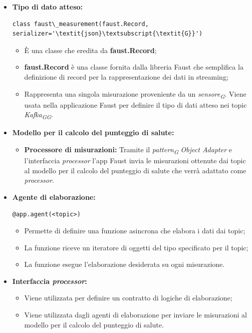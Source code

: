 \begin{itemize}
    \item \textbf{Tipo di dato atteso:}
     \begin{lstlisting}[style=code]
    class faust\_measurement(faust.Record, serializer='\textit{json}\textsubscript{\textit{G}}')
    \end{lstlisting}  
    \begin{itemize}
        \item È una classe che eredita da \textbf{faust.Record};
        \item \textbf{faust.Record} è una classe fornita dalla libreria Faust che semplifica la definizione di record per la rappresentazione dei dati in streaming;
        \item Rappresenta una singola misurazione proveniente da un \textit{sensore}\textsubscript{\textit{G}}. Viene usata nella applicazione Faust per definire il tipo di dati atteso nei topic \textit{Kafka}\textsubscript{\textit{G}}\textsubscript{\textit{G}}.
    \end{itemize}

    \item \textbf{Modello per il calcolo del punteggio di salute:}
    \begin{itemize}
        \item \textbf{Processore di misurazioni:}
        Tramite il \textit{pattern}\textsubscript{\textit{G}} \textit{Object Adapter} e l'interfaccia \textit{processor} l'app Faust invia le misurazioni ottenute dai topic al modello per il calcolo del punteggio di salute che verrà adattato come \textit{processor}.
    \end{itemize}

    \item \textbf{Agente di elaborazione:} 
    \begin{lstlisting}[style=code]
    @app.agent(<topic>)
    \end{lstlisting}  
    \begin{itemize}
        \item Permette di definire una funzione asincrona che elabora i dati dai topic;
        \item La funzione riceve un iteratore di oggetti del tipo specificato per il topic;
        \item La funzione esegue l'elaborazione desiderata su ogni misurazione.
    \end{itemize}

    \item \textbf{Interfaccia \textit{processor}:}
    \begin{itemize}
        \item Viene utilizzata per definire un contratto di logiche di elaborazione;
        \item Viene utilizzata dagli agenti di elaborazione per inviare le misurazioni al modello per il calcolo del punteggio di salute.
    \end{itemize}


\end{itemize}
